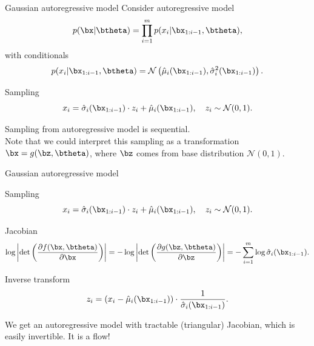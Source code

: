 \begin{frame}{Gaussian autoregressive model}
	Consider autoregressive model
	\[
		p(\bx | \btheta) = \prod_{i=1}^m p(x_i | \bx_{1:i - 1}, \btheta),
	\]
	with conditionals
	\[
	p(x_i | \bx_{1:i - 1}, \btheta) = \mathcal{N} \left(\hat{\mu}_i(\bx_{1:i-1}), \hat{\sigma}^2_i (\bx_{1:i-1})\right).
	\]
	\vspace{-0.5cm}
	\begin{block}{Sampling}
		\[
		x_i = \hat{\sigma}_i (\bx_{1:i-1}) \cdot z_i + \hat{\mu}_i(\bx_{1:i-1}), \quad z_i \sim \mathcal{N}(0, 1).
		\]
	\end{block}
	Sampling from autoregressive model is sequential. \\
	Note that we could interpret this sampling as a transformation $\bx = g(\bz, \btheta)$, where $\bz$ comes from base distribution $\mathcal{N}(0, 1)$.
\end{frame}
\begin{frame}{Gaussian autoregressive model}
	\begin{block}{Sampling}
		\vspace{-0.5cm}
		\[
		x_i = \hat{\sigma}_i (\bx_{1:i-1}) \cdot z_i + \hat{\mu}_i(\bx_{1:i-1}), \quad z_i \sim \mathcal{N}(0, 1).
		\]
		\vspace{-0.5cm}
	\end{block}
	\begin{block}{Jacobian}
		\vspace{-0.5cm}
		\[
		\log \left|\det \left( \frac{\partial f(\bx, \btheta)}{\partial \bx} \right) \right| = -\log \left|\det \left( \frac{\partial g(\bz, \btheta)}{\partial \bz} \right) \right| = - \sum_{i = 1}^m \log \hat{\sigma}_i (\bx_{1:i-1}).
		\]
		\vspace{-0.5cm}
	\end{block} 
	\begin{block}{Inverse transform}
		\vspace{-0.5cm}
		\[
		z_i = \left(x_i - \hat{\mu}_i(\bx_{1:i-1}) \right) \cdot \frac{1}{\hat{\sigma}_i (\bx_{1:i-1}) }.
		\]
	\end{block}
	We get an autoregressive model with tractable (triangular) Jacobian, which is easily invertible. It is a flow!
\end{frame}
